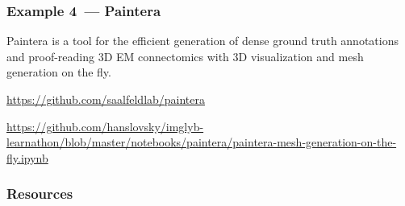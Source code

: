 \documentclass[%
]{beamer}
\newcommand{\urlScrSz}[1]{\scriptsize\url{#1}}
\begin{document}
\begin{frame}
    \frametitle{Example 4~--- Paintera}
    Paintera is a tool for the efficient generation of dense ground truth annotations and proof-reading
    3D EM connectomics with 3D visualization and mesh generation on the fly.

    \urlScrSz{https://github.com/saalfeldlab/paintera}

    \urlScrSz{https://github.com/hanslovsky/imglyb-learnathon/blob/master/notebooks/paintera/paintera-mesh-generation-on-the-fly.ipynb}
\end{frame}

\begin{frame}
    \frametitle{Resources}
    \vspace{2em}
    \newlength{\myYShift}
    \newlength{\myXShift}
    \newlength{\myHeight}
    \setlength{\myYShift}{0.06\linewidth}
    \setlength{\myXShift}{0.30\linewidth}
    \setlength{\myHeight}{0.05\linewidth}
\end{frame}
\end{document}
